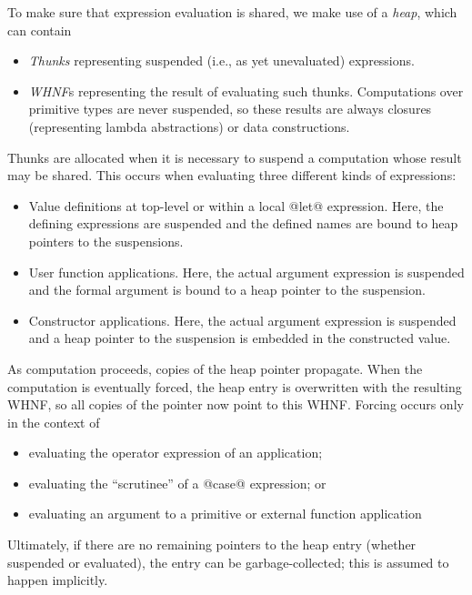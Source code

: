 \documentclass[10pt]{article}
\begin{document}
To make sure that expression evaluation is shared, we
make use of a {\it heap}, which can contain
\begin{itemize}
\item {\em Thunks} representing suspended (i.e., as yet unevaluated) expressions.

\item {\em WHNF}s representing the result of evaluating such thunks. Computations over
primitive types are never suspended, so these results are always closures (representing
lambda abstractions) or data constructions.
\end{itemize}
Thunks are allocated when it
is necessary to suspend a computation whose result may be shared.
This occurs when evaluating three different kinds of expressions:
\begin{itemize}
\item Value definitions at top-level or within a local @let@ expression.
Here, the defining expressions are suspended and the defined names
are bound to heap pointers to the suspensions.

\item User function applications.  Here, the actual argument expression is
suspended and the formal argument is bound to a heap pointer to the suspension.

\item Constructor applications. Here, the actual argument expression is
suspended and a heap pointer to the suspension is embedded in the constructed value.
\end{itemize}

As computation proceeds, copies of the heap pointer propagate. 
When the computation is eventually forced, the heap entry is overwritten with the resulting
WHNF, so all copies of the pointer now point to this WHNF.   Forcing occurs
only in the context of
\begin{itemize}
\item evaluating the operator expression of an application; 

\item evaluating the ``scrutinee'' of a @case@ expression; or 

\item evaluating an argument to a primitive or external function application
\end{itemize}

Ultimately, if there are no remaining pointers to the heap entry (whether suspended or evaluated),
the entry can be garbage-collected; this is assumed to happen implicitly.
\end{document}

